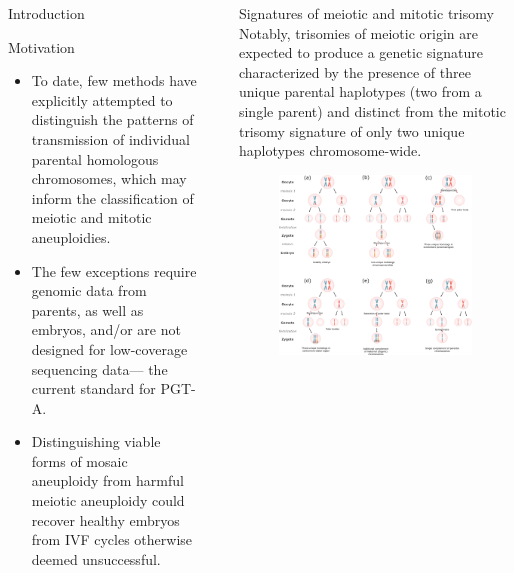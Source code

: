 \documentclass[final]{beamer}
\newlength{\sepwidth}
\newlength{\colwidth}
\newcommand{\separatorcolumn}{\begin{column}{\sepwidth}\end{column}}
\begin{document}
\begin{frame}[t]
\begin{columns}[t]
\begin{column}{\colwidth}
\begin{block}{Introduction}
  \end{block}

  \begin{alertblock}{Motivation}

    \begin{itemize}
     \item To date, few methods have explicitly attempted to distinguish the patterns of transmission of individual parental homologous chromosomes, which may inform the classification of meiotic and mitotic aneuploidies. 
    \item The few exceptions require genomic data from parents, as well as embryos, and/or are not designed for low-coverage sequencing data— the current standard for PGT-A.
    \item Distinguishing viable forms of mosaic aneuploidy from harmful meiotic aneuploidy could recover healthy embryos from IVF cycles otherwise deemed unsuccessful.
    \end{itemize}  
    
    \end{alertblock}

\end{column}

\separatorcolumn

\begin{column}{\colwidth}

\begin{block}{Signatures of meiotic and mitotic trisomy}
Notably, trisomies of meiotic origin are expected to produce a genetic signature characterized by the presence of three unique parental haplotypes (two from a single parent) and distinct from the mitotic trisomy signature of only two unique haplotypes chromosome-wide.
    \begin{figure}
      \centering
     \includegraphics[width=.875\linewidth]{figures/tree5.pdf}


\end{figure}
\end{block}
\end{column}
\end{columns}
\end{frame}
\end{document}
